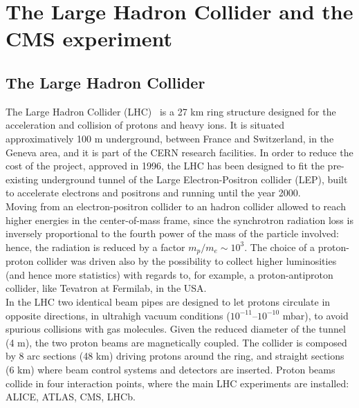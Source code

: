 \chapter{The Large Hadron Collider and the CMS experiment}
\label{chap:LHC_CMS}


\section{The Large Hadron Collider}
The Large Hadron Collider (LHC)~\cite{Evans:2008zzb} is a 27 km ring structure designed for the acceleration and collision of protons and heavy ions. It is situated approximatively 100 m underground, between France and Switzerland, in the Geneva area, and it is part of the CERN %
research facilities. In order to reduce the cost of the project, approved in 1996, the LHC has been designed to fit the pre-existing underground tunnel of the Large Electron-Positron collider (LEP), built to accelerate electrons and positrons and running until the year 2000.\\
Moving from an electron-positron collider to an hadron collider allowed to reach higher energies in the center-of-mass frame, since the synchrotron radiation loss is inversely proportional to the fourth power of the mass of the particle involved: hence, the radiation is reduced by a factor $m_p/m_e \sim 10^3$. The choice of a proton-proton collider was driven also by the possibility to collect higher luminosities (and hence more statistics) with regards to, for example, a proton-antiproton collider, like Tevatron at Fermilab, in the USA.\\
In the LHC two identical beam pipes are designed to let protons circulate in opposite directions, in ultrahigh vacuum conditions ($10^{-11}$--$10^{-10}$ mbar), to avoid spurious collisions with gas molecules. Given the reduced diameter of the tunnel (4 m), the two proton beams are magnetically coupled. The collider is composed by 8 arc sections (48 km) driving protons around the ring, and straight sections (6 km) where beam control systems and detectors are inserted. Proton beams collide in four interaction points, where the main LHC experiments are installed: ALICE, ATLAS, CMS, LHCb.

